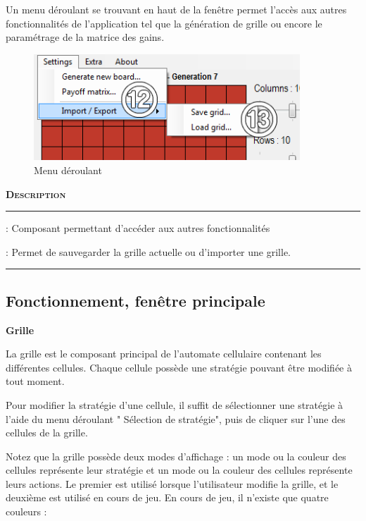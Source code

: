 \documentclass[a4paper, french]{article}
\newcommand*\circled[1]{\tikz[baseline=(char.base)]{
                \node[shape=circle,thick,draw,inner sep=2pt] (char) {\textbf{#1}};}
            }
\newcommand*\tinycircled[1]{\tikz[baseline=(char.base)]{
                \node[shape=circle,draw,inner sep=1pt] (char) {\footnotesize{#1}};}
            }
\begin{document}
Un menu déroulant se trouvant en haut de la fenêtre permet l'accès aux autres fonctionnalités de l'application tel que la génération de grille ou encore le paramétrage de la matrice des gains.

\begin{figure}[htp]
    \centering
    \includegraphics[width=10cm]{main_view_menu.png}
    \caption{Menu déroulant}
\end{figure}

\begin{description}[labelwidth=5cm]
    \small
    \item[\textbf{\textsc{Nom}}] \textbf{\textsc{Description}}
    \vspace{0.1cm}
    \hrule{}
    \item[\texttt{\circled{12} Menu déroulant}] : Composant permettant d'accéder aux autres fonctionnalités
    \item[\texttt{\circled{13} Paramètres d'exportation}] : Permet de sauvegarder la grille actuelle ou d'importer une grille. 
\end{description}
\hrule{}

\subsection{Fonctionnement, fenêtre principale}
\textbf{\circled{1} Grille}

La grille est le composant principal de l'automate cellulaire contenant les différentes cellules. Chaque cellule possède une stratégie pouvant être modifiée à tout moment.

Pour modifier la stratégie d'une cellule, il suffit de sélectionner une stratégie à l'aide du menu déroulant "\tinycircled{6} Sélection de stratégie", puis de cliquer sur l'une des cellules de la grille.

Notez que la grille possède deux modes d'affichage : un mode ou la couleur des cellules représente leur stratégie et un mode ou la couleur des cellules représente leurs actions. Le premier est utilisé lorsque  l'utilisateur modifie la grille, et le deuxième est utilisé en cours de jeu. En cours de jeu, il n'existe que quatre couleurs :
\end{document}
